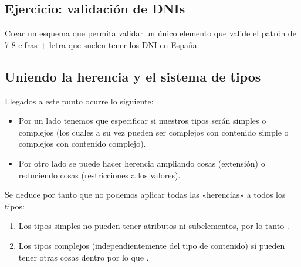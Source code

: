 \documentclass[letterpaper,10pt,spanish]{sphinxmanual}
\begin{document}
\subsection{Ejercicio: validación de DNIs}
\label{\detokenize{tema5:ejercicio-validacion-de-dnis}}
Crear un esquema que permita validar un único elemento  que valide el patrón de 7-8 cifras + letra que suelen tener los DNI en España:

\begin{sphinxVerbatim}[commandchars=\\\{\}]
    
   
     
       
\end{sphinxVerbatim}


\subsection{Uniendo la herencia y el sistema de tipos}
\label{\detokenize{tema5:uniendo-la-herencia-y-el-sistema-de-tipos}}
Llegados a este punto ocurre lo siguiente:
\begin{itemize}
\item {} 
Por un lado tenemos que especificar si nuestros tipos serán simples o complejos (los cuales a su vez pueden ser complejos con contenido simple o complejos con contenido complejo).

\item {} 
Por otro lado se puede hacer herencia ampliando cosas (extensión) o reduciendo cosas (restricciones a los valores).

\end{itemize}

Se deduce por tanto que no podemos aplicar todas las «herencias» a todos los tipos:
\begin{enumerate}
\item {} 
Los tipos simples no pueden tener atributos ni subelementos, por lo tanto .

\item {} 
Los tipos complejos (independientemente del tipo de contenido) sí pueden tener otras cosas dentro por lo que .

\end{enumerate}
\end{document}
